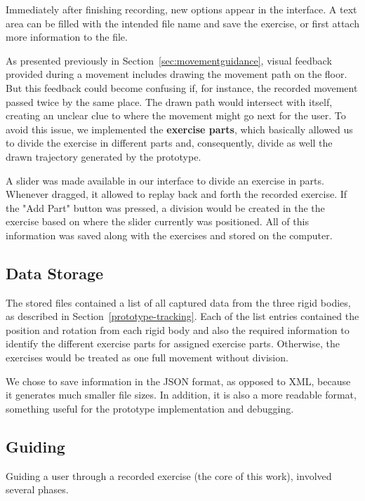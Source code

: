 Immediately after finishing recording, new options appear in the interface. 
A text area can be filled with the intended file name and save the exercise, or first attach more information to the file.

As presented previously in Section~\ref{sec:movementguidance}, visual feedback provided during a movement includes drawing the movement path on the floor. 
But this feedback could become confusing if, for instance, the recorded movement passed twice by the same place. 
The drawn path would intersect with itself, creating an unclear clue to where the movement might go next for the user. 
To avoid this issue, we implemented the \textbf{exercise parts}, which basically allowed us to divide the exercise in different parts and, consequently, divide as well the drawn trajectory generated by the prototype.

A slider was made available in our interface to divide an exercise in parts. Whenever dragged, it allowed to replay back and forth the recorded exercise. 
If the "Add Part" button was pressed, a division would be created in the the exercise based on where the slider currently was positioned.
All of this information was saved along with the exercises and stored on the computer.



\subsection{Data Storage}

The stored files contained a list of all captured data from the three rigid bodies, as described in Section~\ref{prototype-tracking}. 
Each of the list entries contained the position and rotation from each rigid body and also the required information to identify the different exercise parts for assigned exercise parts. Otherwise, the exercises would be treated as one full movement without division.

We chose to save information in the JSON format, as opposed to XML, because it generates much smaller file sizes. In addition, it is also a more readable format, something useful for the prototype implementation and debugging.

\subsection{Guiding}

Guiding a user through a recorded exercise (the core of this work), involved several phases.

